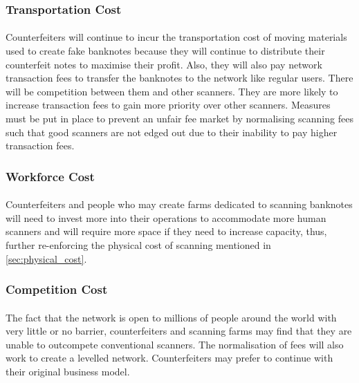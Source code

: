  

\vspace{1mm}
\subsubsection{Transportation Cost}
\paragraph{}Counterfeiters will continue to incur the transportation cost of moving materials used to create fake banknotes because they will continue to distribute their counterfeit notes to maximise their profit. Also, they will also pay network transaction fees to transfer the banknotes to the network like regular users. There will be competition between them and other scanners. They are more likely to increase transaction fees to gain more priority over other scanners. Measures must be put in place to prevent an unfair fee market by normalising scanning fees such that good scanners are not edged out due to their inability to pay higher transaction fees. 


\vspace{1mm}
\subsubsection{Workforce Cost}
\paragraph{}Counterfeiters and people who may create farms dedicated to scanning banknotes will need to invest more into their operations to accommodate more human scanners and will require more space if they need to increase capacity, thus, further re-enforcing the physical cost of scanning mentioned in \autoref{sec:physical_cost}. 


\vspace{1mm}
\subsubsection{Competition Cost}
\paragraph{}The fact that the network is open to millions of people around the world with very little or no barrier, counterfeiters and scanning farms may find that they are unable to outcompete conventional scanners. The normalisation of fees will also work to create a levelled network. Counterfeiters may prefer to continue with their original business model. 



